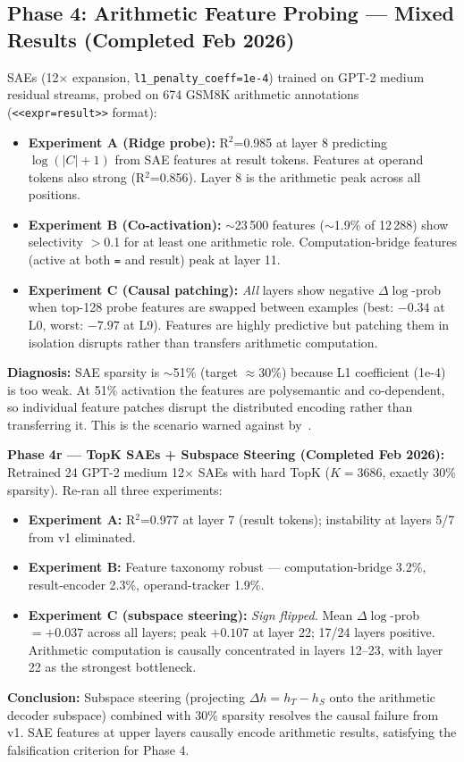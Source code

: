 \documentclass{article}
\begin{document}
\subsection{Phase 4: Arithmetic Feature Probing — Mixed Results (Completed Feb 2026)}
SAEs (12$\times$ expansion, \texttt{l1\_penalty\_coeff=1e-4}) trained on GPT-2 medium residual streams, probed on 674 GSM8K arithmetic annotations (\texttt{<<expr=result>>} format):
\begin{itemize}
  \item \textbf{Experiment A (Ridge probe):} R$^2$=0.985 at layer 8 predicting $\log(|C|+1)$ from SAE features at result tokens. Features at operand tokens also strong (R$^2$=0.856). Layer 8 is the arithmetic peak across all positions.
  \item \textbf{Experiment B (Co-activation):} $\sim$23\,500 features ($\sim$1.9\% of 12\,288) show selectivity $>$0.1 for at least one arithmetic role. Computation-bridge features (active at both \texttt{=} and result) peak at layer 11.
  \item \textbf{Experiment C (Causal patching):} \textit{All} layers show negative $\Delta\log$-prob when top-128 probe features are swapped between examples (best: $-0.34$ at L0, worst: $-7.97$ at L9). Features are highly predictive but patching them in isolation disrupts rather than transfers arithmetic computation.
\end{itemize}
\textbf{Diagnosis:} SAE sparsity is $\sim$51\% (target $\approx30\%$) because L1 coefficient (1e-4) is too weak. At 51\% activation the features are polysemantic and co-dependent, so individual feature patches disrupt the distributed encoding rather than transferring it. This is the scenario warned against by~\citet{SAE-Identifiability}.

\textbf{Phase 4r — TopK SAEs + Subspace Steering (Completed Feb 2026):}
Retrained 24 GPT-2 medium 12$\times$ SAEs with hard TopK ($K=3686$, exactly 30\% sparsity).  Re-ran all three experiments:
\begin{itemize}
  \item \textbf{Experiment A:} R$^2$=0.977 at layer 7 (result tokens); instability at layers 5/7 from v1 eliminated.
  \item \textbf{Experiment B:} Feature taxonomy robust — computation-bridge 3.2\%, result-encoder 2.3\%, operand-tracker 1.9\%.
  \item \textbf{Experiment C (subspace steering):} \textit{Sign flipped.} Mean $\Delta\log$-prob $= +0.037$ across all layers; peak $+0.107$ at layer 22; 17/24 layers positive.  Arithmetic computation is causally concentrated in layers 12--23, with layer 22 as the strongest bottleneck.
\end{itemize}
\textbf{Conclusion:} Subspace steering (projecting $\Delta h = h_T - h_S$ onto the arithmetic decoder subspace) combined with 30\% sparsity resolves the causal failure from v1.  SAE features at upper layers causally encode arithmetic results, satisfying the falsification criterion for Phase 4.
\end{document}
